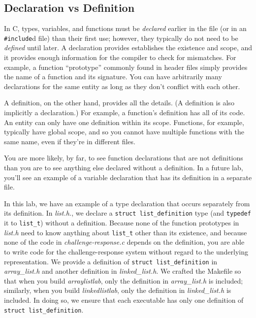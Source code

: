 \subsection{Declaration vs Definition}

In C, types, variables, and functions must be \textit{declared} earlier in the file (or in an \lstinline{#include}d file) than their first use;
however, they typically do not need to be \textit{defined} until later.
A declaration provides establishes the existence and scope, and it provides enough information for the compiler to check for mismatches.
For example, a function ``prototype'' commonly found in header files simply provides the name of a function and its signature.
You can have arbitrarily many declarations for the same entity as long as they don't conflict with each other.

A definition, on the other hand, provides all the details.
(A definition is also implicitly a declaration.)
For example, a function's definition has all of its code.
An entity can only have one definition within its scope.
Functions, for example, typically have global scope, and so you cannot have multiple functions with the same name, even if they're in different files.

You are more likely, by far, to see function declarations that are not definitions than you are to see anything else declared without a definition.
In a future lab, you'll see an example of a variable declaration that has its definition in a separate file.

In this lab, we have an example of a type declaration that occurs separately from its definition.
In \textit{list.h.}, we declare a \lstinline{struct list_definition} type (and \lstinline{typedef} it to \lstinline{list_t}) without a definition.
Because none of the function prototypes in \textit{list.h} need to know anything about \lstinline{list_t} other than its existence, and because none of the code in \textit{challenge-response.c} depends on the definition, you are able to write code for the challenge-response system without regard to the underlying representation.
We provide a definition of \lstinline{struct list_definition} in \textit{array\_list.h} and another definition in \textit{linked\_list.h}.
We crafted the Makefile so that when you build \textit{arraylistlab}, only the definition in \textit{array\_list.h} is included;
similarly, when you build \textit{linkedlistlab}, only the definition in \textit{linked\_list.h} is included.
In doing so, we ensure that each executable has only one definition of \lstinline{struct list_definition}.

